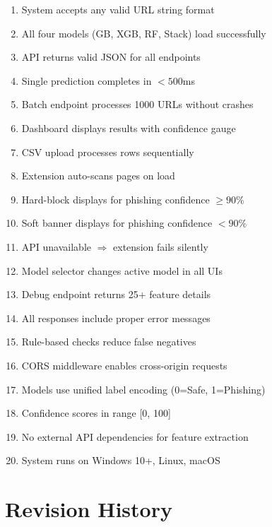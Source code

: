 \documentclass[12pt,a4paper]{report}
\begin{document}
\begin{enumerate}[leftmargin=*]
    \item[$\square$] System accepts any valid URL string format
    \item[$\square$] All four models (GB, XGB, RF, Stack) load successfully
    \item[$\square$] API returns valid JSON for all endpoints
    \item[$\square$] Single prediction completes in $<500$ms
    \item[$\square$] Batch endpoint processes 1000 URLs without crashes
    \item[$\square$] Dashboard displays results with confidence gauge
    \item[$\square$] CSV upload processes rows sequentially
    \item[$\square$] Extension auto-scans pages on load
    \item[$\square$] Hard-block displays for phishing confidence $\geq 90\%$
    \item[$\square$] Soft banner displays for phishing confidence $< 90\%$
    \item[$\square$] API unavailable $\Rightarrow$ extension fails silently
    \item[$\square$] Model selector changes active model in all UIs
    \item[$\square$] Debug endpoint returns 25+ feature details
    \item[$\square$] All responses include proper error messages
    \item[$\square$] Rule-based checks reduce false negatives
    \item[$\square$] CORS middleware enables cross-origin requests
    \item[$\square$] Models use unified label encoding (0=Safe, 1=Phishing)
    \item[$\square$] Confidence scores in range [0, 100]
    \item[$\square$] No external API dependencies for feature extraction
    \item[$\square$] System runs on Windows 10+, Linux, macOS
\end{enumerate}

\chapter{Revision History}
\end{document}
